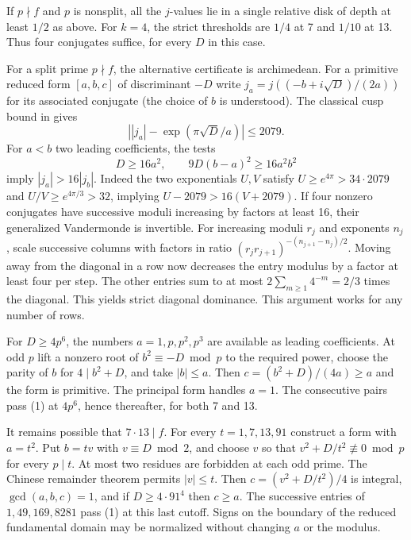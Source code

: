 If $p\nmid f$ and $p$ is nonsplit, all the $j$-values lie in a single relative disk of depth at least $1/2$ as above. For $k=4$, the strict thresholds are $1/4$ at 7 and $1/10$ at 13. Thus four conjugates suffice, for every $D$ in this case.

For a split prime $p\nmid f$, the alternative certificate is archimedean. For a primitive reduced form $[a,b,c]$ of discriminant $-D$ write $j_a=j((-b+i\sqrt D)/(2a))$ for its associated conjugate (the choice of $b$ is understood). The classical cusp bound in \cite[\S2]{blp} gives
\[
       \left||j_a|-\exp(\pi\sqrt D/a)\right|\le2079.
\]
For $a<b$ two leading coefficients, the tests
\[
 D\ge16a^2,\qquad 9D(b-a)^2\ge16a^2 b^2                                    \tag{1}
\]
imply $|j_a|>16|j_b|$. Indeed the two exponentials $U,V$ satisfy
$U\ge e^{4\pi}>34\cdot2079$ and $U/V\ge e^{4\pi/3}>32$, implying $U-2079>16(V+2079)$.
If four nonzero conjugates have successive moduli increasing by factors at least 16, their generalized Vandermonde is invertible. For increasing moduli $r_j$ and exponents $n_j$, scale successive columns with factors in ratio $(r_jr_{j+1})^{-(n_{j+1}-n_j)/2}$. Moving away from the diagonal in a row now decreases the entry modulus by a factor at least four per step. The other entries sum to at most $2\sum_{m\ge1}4^{-m}=2/3$ times the diagonal. This yields strict diagonal dominance. This argument works for any number of rows.

For $D\ge 4p^6$, the numbers $a=1,p,p^2,p^3$ are available as leading coefficients. At odd $p$ lift a nonzero root of $b^2\equiv -D\bmod p$ to the required power, choose the parity of $b$ for $4\mid b^2+D$, and take $|b|\le a$. Then $c=(b^2+D)/(4a)\ge a$ and the form is primitive. The principal form handles $a=1$. The consecutive pairs pass (1) at $4p^6$, hence thereafter, for both 7 and 13.

It remains possible that $7\cdot13\mid f$. For every $t=1,7,13,91$ construct a form with $a=t^2$. Put $b=tv$ with $v\equiv D\bmod2$, and choose $v$ so that $v^2+D/t^2\not\equiv0\bmod p$ for every $p\mid t$. At most two residues are forbidden at each odd prime. The Chinese remainder theorem permits $|v|\le t$. Then $c=(v^2+D/t^2)/4$ is integral, $\gcd(a,b,c)=1$, and if $D\ge4\cdot91^4$ then $c\ge a$. The successive entries of $1,49,169,8281$ pass (1) at this last cutoff. Signs on the boundary of the reduced fundamental domain may be normalized without changing $a$ or the modulus.

